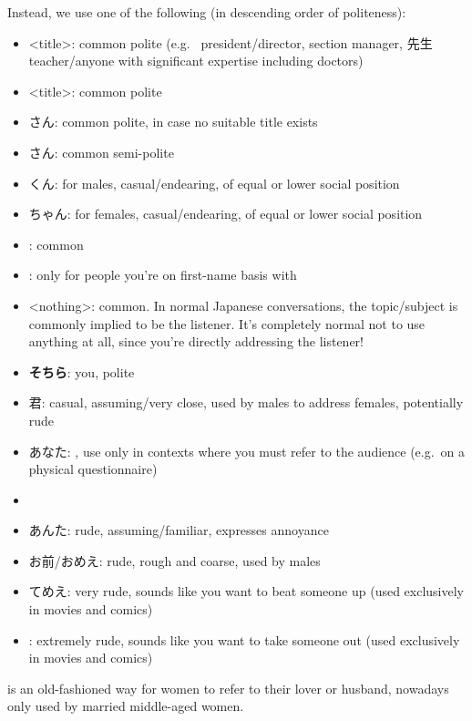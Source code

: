 \documentclass[../nihongo-gakushuu-kyouzai.tex]{subfiles}
\begin{document}
Instead, we use one of the following (in descending order of politeness):
\begin{itemize}
    \item <title>: common polite (e.g.\  president/director,  section manager, 先生 teacher/anyone with significant expertise including doctors)
    \item <last name><title>: common polite
    \item <last name>さん: common polite, in case no suitable title exists
    \item <first name>さん: common semi-polite
    \item <last name>くん: for males, casual/endearing, of equal or lower social position
    \item <last name>ちゃん: for females, casual/endearing, of equal or lower social position
    \item <last name>: common
    \item <first name>[\{くん, ちゃん\}]: only for people you're on first-name basis with
    \item <nothing>: common. In normal Japanese conversations, the topic/subject is commonly implied to be the listener. It's completely normal not to use anything at all, since you're directly addressing the listener!
    \item \textbf{そちら}: you, polite
    \item 君: casual, assuming/very close, used by males to address females, potentially rude
    \item あなた: , use only in contexts where you must refer to the audience (e.g.\ on a physical questionnaire)
    \item {}
    \item あんた: rude, assuming/familiar, expresses annoyance
    \item お前/おめえ: rude, rough and coarse, used by males
    \item てめえ: very rude, sounds like you want to beat someone up (used exclusively in movies and comics)
    \item {}: extremely rude, sounds like you want to take someone out (used exclusively in movies and comics)
\end{itemize}

 is an old-fashioned way for women to refer to their lover or husband, nowadays only used by married middle-aged women.
\end{document}
